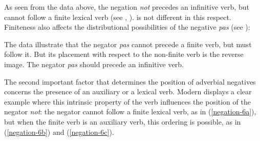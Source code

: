 \documentclass[output=paper
	        ,collection
	        ,collectionchapter
 	        ,biblatex
                ,babelshorthands
                ,newtxmath
                ,draftmode
                ,colorlinks, citecolor=brown
]{langscibook}
\begin{document}
\begin{exe}
\ex\label{negation-eng-fin-neg} \begin{xlist}
\zl


\begin{exe}
\ex\label{negation-fr-fin-neg} \begin{xlist}
\zl
%
\noindent As seen from the data above, the negation \textit{not} precedes an infinitive verb, but cannot follow
a finite lexical  verb (see \citealt[Chapter~15]{Baker:89}, \citealt{Baker:91,Ernst:92}).
 is not different in this respect. Finiteness also affects the distributional possibilities of the  negative \emph{pas} (see \citealt{AG:97, KS:02, Zeijlstra:15}):

\eal
{}
\zl

\eal{}
\zl

\noindent
The data illustrate that the negator \textit{pas} cannot precede a finite verb,
but must follow it. But its placement with respect to
the non-finite verb is the reverse image. The negator \textit{pas}
should precede an infinitive verb.

The second important factor that determines the position of adverbial
negatives concerns the presence of an auxiliary or a lexical  verb.
Modern  displays a clear example where this
intrinsic property of the verb influences the position of
the  negator \textit{not}: the negator cannot follow
a finite lexical  verb, as in (\ref{negation-6a}), but when the finite verb is an auxiliary verb,
this ordering is possible, as in (\ref{negation-6b}) and (\ref{negation-6c}).


\end{xlist}
\end{exe}
\end{xlist}
\end{exe}
\end{document}
